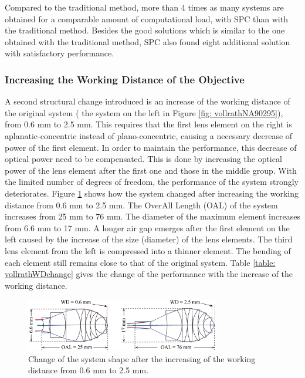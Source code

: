 Compared to the traditional method, more than 4 times as many systems are obtained for a comparable amount of computational load, with SPC than with the traditional method. Besides the good solutions which is similar to the one obtained with the traditional method, SPC also found eight additional solution with satisfactory performance. 

\newpage
\subsubsection{Increasing the Working Distance of the Objective}
A second structural change introduced is an increase of the working distance of the original system ( the system on the left in Figure \ref{fig: vollrathNA90295}), from 0.6 mm to 2.5 mm. This requires that the first lens element on the right is aplanatic-concentric instead of plano-concentric, causing a necessary decrease of power of the first element. In order to maintain the performance, this decrease of optical power need to be compensated. This is done by increasing the optical power of the lens element after the first one and those in the middle group. With the limited number of degrees of freedom, the performance of the system strongly deteriorates. Figure \ref{fig: vollrathWD06to25} shows how the system changed after increasing the working distance from 0.6 mm to 2.5 mm. The OverAll Length (OAL) of the system increases from 25 mm to 76 mm. The diameter of the maximum element increases from 6.6 mm to 17 mm. A longer air gap emerges after the first element on the left caused by the increase of the size (diameter) of the lens elements. The third lens element from the left is compressed into a thinner element. The bending of each element still remains close to that of the original system. Table \ref{table: vollrathWDchange} gives the change of the performance with the increase of the working distance. 

\begin{figure}[h!]
    \centering
    \includegraphics[width=0.75\textwidth]{chapter-4/figures/Vollrath_WD06TO25.png}
    \caption{Change of the system shape after the increasing of the working distance from 0.6 mm to 2.5 mm.}
    \label{fig: vollrathWD06to25}
\end{figure}

